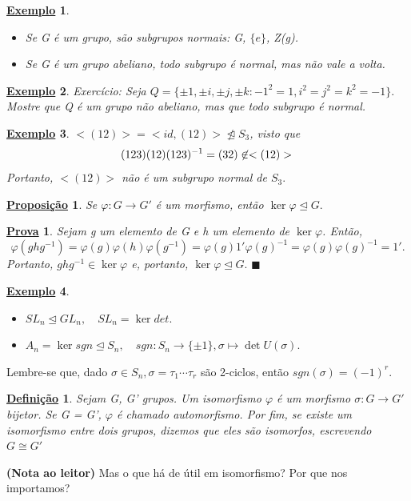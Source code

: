 \documentclass{article}
\newtheorem*{def*}{\underline{Defini\c c\~ao}}
\newtheorem*{prop*}{\underline{Proposi\c c\~ao}}
\newtheorem{example*}{\underline{Exemplo}}
\newtheorem*{proof*}{\underline{Prova}}
\renewcommand\qedsymbol{$\blacksquare$}
\begin{document}
\begin{example*}
 \begin{itemize}
   \item[1)] Se G \'e um grupo, s\~ao subgrupos normais: G, $\{e\}$, Z(g).
   \item[2)] Se G \'e um grupo abeliano, todo subgrupo \'e normal, mas n\~ao vale a volta.
 \end{itemize}
\end{example*}
 \begin{example*}
   Exerc\'icio: Seja $Q = \{\pm1, \pm i, \pm j, \pm k: -1^{2} = 1, i^{2} = j^{2} = k^{2} = -1\}.$ Mostre que Q \'e um grupo
n\~ao abeliano, mas que todo subgrupo \'e normal.
 \end{example*}
\begin{example*}
  $<(12)> = <id, (12)>\not\trianglelefteq{S_{3}}$, visto que 
  $$
    (123)(12)(123)^{-1} = (32)\not\in <(12)>\\
  $$
  Portanto, $<(12)>$ n\~ao \'e um subgrupo normal de $S_{3}.$
\end{example*}
 \begin{prop*}
   Se $\varphi:G\rightarrow G'$ \'e um morfismo, ent\~ao $\ker{\varphi}\trianglelefteq{G}.$
 \end{prop*}
\begin{proof*}
  Sejam g um elemento de G e h um elemento de $\ker{\varphi}$. Ent\~ao, 
    $$
      \varphi(ghg^{-1}) = \varphi(g)\varphi(h)\varphi(g^{-1}) = \varphi(g)1'\varphi(g)^{-1} = \varphi(g)\varphi(g)^{-1} = 1'.
    $$
    Portanto, $ghg^{-1}\in\ker{\varphi}$ e, portanto, $\ker{\varphi}\trianglelefteq{G}.$ \qedsymbol
\end{proof*}
 \begin{example*}
  \begin{itemize}
    \item[1)] $SL_{n}\trianglelefteq{GL_{n}}, \quad SL_{n} = \ker{det}.$
    \item[2)] $A_{n} = \ker{sgn}\trianglelefteq{S_{n}}, \quad sgn:S_{n}\rightarrow\{\pm 1\}, \sigma\mapsto \det{U(\sigma)}.$
  \end{itemize}
 \end{example*}
 Lembre-se que, dado $\sigma\in S_{n}, \sigma = \tau_{1}\cdots\tau_{r}$ s\~ao 2-ciclos, ent\~ao $sgn(\sigma) = (-1)^{r}.$
\begin{def*}
  Sejam G, G' grupos. Um isomorfismo $\varphi$ \'e um morfismo $\sigma:G\rightarrow G'$ bijetor. Se G = G', $\varphi$ \'e chamado automorfismo.
Por fim, se existe um isomorfismo entre dois grupos, dizemos que eles s\~ao isomorfos, escrevendo $G\cong G'$
\end{def*}
\textbf{(Nota ao leitor)} Mas o que h\'a de \'util em isomorfismo? Por que nos importamos? 
\end{document}

